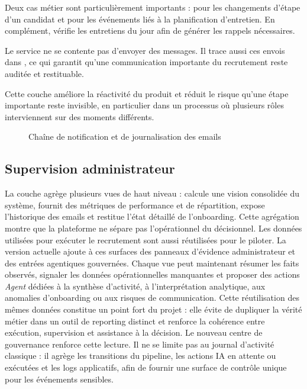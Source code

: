 Deux cas métier sont particulièrement importants :  pour les changements d'étape d'un candidat et  pour les événements liés à la planification d'entretien. En complément,  vérifie les entretiens du jour afin de générer les rappels nécessaires.

Le service  ne se contente pas d'envoyer des messages. Il trace aussi ces envois dans , ce qui garantit qu'une communication importante du recrutement reste auditée et restituable.

Cette couche améliore la réactivité du produit et réduit le risque qu'une étape importante reste invisible, en particulier dans un processus où plusieurs rôles interviennent sur des moments différents.

\begin{figure}[H]
  \centering
  \caption{Chaîne de notification et de journalisation des emails}
\end{figure}

\subsection{Supervision administrateur}
La couche  agrège plusieurs vues de haut niveau :  calcule une vision consolidée du système,  fournit des métriques de performance et de répartition,  expose l'historique des emails et  restitue l'état détaillé de l'onboarding.
Cette agrégation montre que la plateforme ne sépare pas l'opérationnel du décisionnel. Les données utilisées pour exécuter le recrutement sont aussi réutilisées pour le piloter.
La version actuelle ajoute à ces surfaces des panneaux d'évidence administrateur et des entrées agentiques gouvernées. Chaque vue peut maintenant résumer les faits observés, signaler les données opérationnelles manquantes et proposer des actions \textit{Agent} dédiées à la synthèse d'activité, à l'interprétation analytique, aux anomalies d'onboarding ou aux risques de communication.
Cette réutilisation des mêmes données constitue un point fort du projet : elle évite de dupliquer la vérité métier dans un outil de reporting distinct et renforce la cohérence entre exécution, supervision et assistance à la décision.
Le nouveau centre de gouvernance renforce cette lecture. Il ne se limite pas au journal d'activité classique : il agrège les transitions du pipeline, les actions IA en attente ou exécutées et les logs applicatifs, afin de fournir une surface de contrôle unique pour les événements sensibles.

